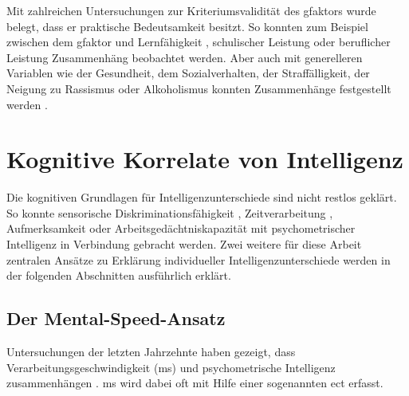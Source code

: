 \documentclass[11pt, twoside, a4paper]{book}		%
\begin{document}
Mit zahlreichen Untersuchungen zur Kriteriumsvalidität des \gls{gfaktor}s wurde belegt, dass er praktische Bedeutsamkeit besitzt. So konnten zum Beispiel zwischen dem \gls{gfaktor} und Lernfähigkeit \citep{Christal1991}, schulischer Leistung \citep{Jensen1998b} oder beruflicher Leistung \citep{Schmidt2004} Zusammenhäng beobachtet werden. Aber auch mit generelleren Variablen wie der Gesundheit, dem Sozialverhalten, der Straffälligkeit, der Neigung zu Rassismus oder Alkoholismus konnten Zusammenhänge festgestellt werden \citep[für eine Übersicht siehe][]{Brand1987}.





\section{Kognitive Korrelate von Intelligenz}

Die kognitiven Grundlagen für Intelligenzunterschiede sind nicht restlos geklärt. So konnte sensorische Diskriminationsfähigkeit \citep[z. B.][]{Galton1883, Spearman1904, Deary2004, Meyer2010}, Zeitverarbeitung \citep[z. B.][]{Rammsayer2002}, Aufmerksamkeit \citep[z. B.][]{Schweizer2004} oder Arbeitsgedächtniskapazität \citep[für eine Übersichtsarbeit siehe][]{Ackerman2005} mit psychometrischer Intelligenz in Verbindung gebracht werden.
Zwei weitere für diese Arbeit zentralen Ansätze zu Erklärung individueller Intelligenzunterschiede werden in der folgenden Abschnitten ausführlich erklärt.


\subsection{Der Mental-Speed-Ansatz}

Untersuchungen der letzten Jahrzehnte  haben gezeigt, dass Verarbeitungsgeschwindigkeit (\gls{ms}) und psychometrische Intelligenz zusammenhängen \citep[für Übersichtsarbeiten siehe][]{Deary2000a, Jensen2006, Sheppard2008}. \gls{ms} wird dabei oft mit Hilfe einer sogenannten \gls{ect} erfasst. 
\end{document}
